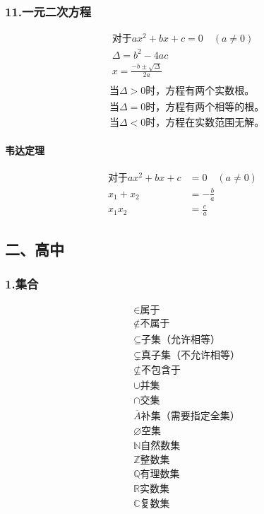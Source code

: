 \documentclass{ctexart}
\begin{document}
\subsubsection*{11.一元二次方程}
\begin{gather*}
\text{对于}ax^2+bx+c=0\quad(a\neq0) \\
\Delta=b^2-4ac \\
x=\frac{-b\pm\sqrt{\Delta}}{2a} \\
\end{gather*}
\begin{align*}
&\text{当$\Delta>0$时，方程有两个实数根。} \\
&\text{当$\Delta=0$时，方程有两个相等的根。} \\
&\text{当$\Delta<0$时，方程在实数范围无解。}
\end{align*}
\paragraph{韦达定理}
\begin{align*}
\text{对于}ax^2+bx+c&=0\quad(a\neq0) \\
x_1+x_2&=-\frac{b}{a} \\
x_1x_2&=\frac{c}{a}
\end{align*}
\subsection*{二、高中}
\subsubsection*{1.集合}
\begin{align*}
&\text{$\in$属于} \\
&\text{$\notin$不属于} \\
&\text{$\subseteq$子集（允许相等）} \\
&\text{$\subsetneq$真子集（不允许相等）} \\
&\text{$\nsubseteq$不包含于} \\
&\text{$\cup$并集} \\
&\text{$\cap$交集} \\
&\text{$\overline{A}$补集（需要指定全集）} \\
&\text{$\varnothing$空集} \\
&\text{$\mathbb{N}$自然数集} \\
&\text{$\mathbb{Z}$整数集} \\
&\text{$\mathbb{Q}$有理数集} \\
&\text{$\mathbb{R}$实数集} \\
&\text{$\mathbb{C}$复数集}
\end{align*}
\end{document}
